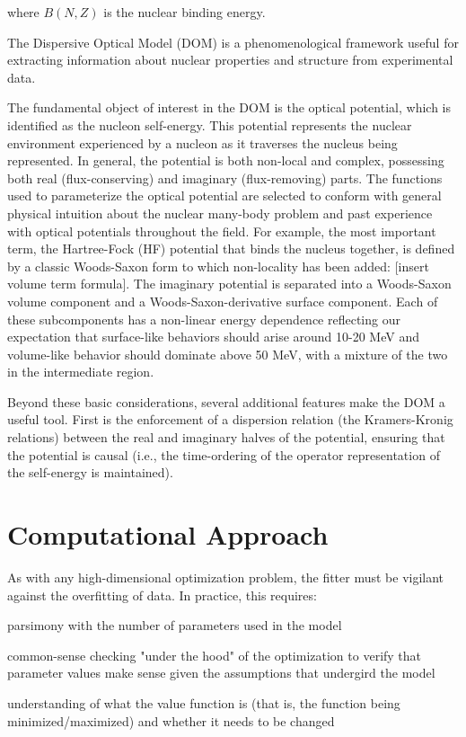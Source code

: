 where $B(N,Z)$ is the nuclear binding energy.

The Dispersive Optical Model (DOM) is a phenomenological framework useful for 
extracting information about nuclear properties and structure from experimental
data.

The fundamental object of interest in the DOM is the \Gls{optical potential},
which is identified as the \Gls{nucleon self-energy}. This potential represents
the nuclear environment experienced
by a nucleon as it traverses the nucleus being represented. In general, the
potential is both non-local and complex, possessing both real (flux-conserving)
and imaginary (flux-removing) parts. The functions used to parameterize the optical potential
are selected to conform with general physical intuition about the nuclear
many-body problem and past experience with optical potentials throughout the
field. For example, the most important term, the Hartree-Fock (HF) potential
that binds the nucleus together, is defined by a classic Woods-Saxon form to
which non-locality has been added: [insert volume term formula]. The imaginary
potential is separated into a Woods-Saxon volume component and a
Woods-Saxon-derivative surface component. Each of these subcomponents has
a non-linear energy dependence reflecting our expectation that surface-like
behaviors should arise around 10-20 MeV and volume-like behavior should dominate
above 50 MeV, with a mixture of the two in the intermediate region.

Beyond these basic considerations, several additional features make the 
DOM a useful tool. First is the enforcement of a
dispersion relation (the Kramers-Kronig relations) between the real and imaginary
halves of the potential, ensuring that the potential is causal (i.e., the
time-ordering of the operator representation of the self-energy is maintained).

\section{Computational Approach}
As with any high-dimensional optimization problem, the fitter must be vigilant
against the overfitting of data. In practice, this requires:

parsimony with the number of parameters used in the model

common-sense checking "under the hood" of the optimization to verify that
parameter values make sense given the assumptions that undergird the model

understanding of what the value function is (that is, the function being
minimized/maximized) and whether it needs to be changed


